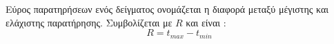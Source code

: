 Εύρος παρατηρήσεων ενός δείγματος ονομάζεται η διαφορά μεταξύ μέγιστης και ελάχιστης παρατήρησης. Συμβολίζεται με $ R $ και είναι :
\[ R=t_{max}-t_{min} \]
